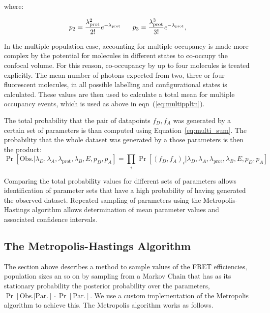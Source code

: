 where:

\begin{equation}
\footnotesize
p_2 = \frac{\lambda_{\text{prot}}^2}{2!}e^{-\lambda_{\text{prot}}} \qquad
p_3 = \frac{\lambda_{\text{prot}}^3}{3!}e^{-\lambda_{\text{prot}}} ,
\end{equation}

In the multiple population case, accounting for multiple occupancy is made more complex by the potential for molecules in different states to co-occupy the confocal volume. For this reason, co-occupancy by up to four molecules is treated explicitly. The mean number of photons expected from two, three or four fluorescent molecules, in all possible labelling and configurational states is calculated. These values are then used to calculate a total mean for multiple occupancy events, which is used as above in eqn~(\ref{eq:multippltn}). 

The total probability that the pair of datapoints $f_D, f_A$ was generated by a certain set of parameters is than computed using Equation~\ref{eq:multi_sum}. The probability that the whole dataset was generated by a those parameters is then the product:
\begin{equation}
\Pr[\text{Obs.}|\lambda_D, \lambda_A, \lambda_{\text{prot}}, \lambda_B, E, p_D, p_A] = \prod_i \Pr[(f_D, f_A)_i |\lambda_D, \lambda_A, \lambda_{\text{prot}}, \lambda_B, E, p_D, p_A]
\end{equation}

Comparing the total probability values for different sets of parameters allows identification of parameter sets that have a high probability of having generated the observed dataset. Repeated sampling of parameters using the Metropolis-Hastings algorithm allows determination of mean parameter values and associated confidence intervals.  

\subsection*{The Metropolis-Hastings Algorithm}

The section above describes a method to sample values of the FRET efficiencies, population sizes an so on by sampling from a Markov Chain that has as its stationary probability the posterior probability over the parameters, $\Pr[\text{Obs.} | \text{Par.}] \cdot \Pr[\text{Par.}]$. We use a custom implementation of the Metropolis algorithm to achieve this. The Metropolis algorithm works as follows.

